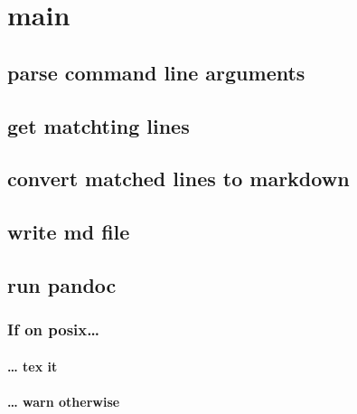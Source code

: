 \documentclass[]{article}
\begin{document}
\section{main}\label{main}

\subsection{parse command line
arguments}\label{parse-command-line-arguments}

\subsection{get matchting lines}\label{get-matchting-lines}

\subsection{convert matched lines to
markdown}\label{convert-matched-lines-to-markdown}

\subsection{write md file}\label{write-md-file}

\subsection{run pandoc}\label{run-pandoc}

\subsubsection{If on posix\ldots{}}\label{if-on-posix}

\paragraph{\ldots{} tex it}\label{tex-it}

\paragraph{\ldots{} warn otherwise}\label{warn-otherwise}
\end{document}
